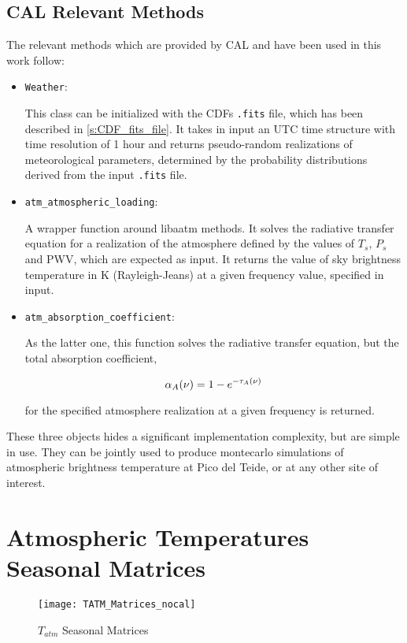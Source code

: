 \subsection{CAL Relevant Methods}

The relevant methods which are provided by CAL and have been used in this
work follow:

\begin{itemize}
        \item \texttt{Weather}:

        This class can be initialized with the CDFs \texttt{.fits} file, which
        has been described in \autoref{s:CDF_fits_file}. It takes in input
        an UTC time structure with time resolution of \num{1} hour and
        returns pseudo-random realizations of meteorological parameters,
        determined by the probability distributions derived from the input
        \texttt{.fits} file.

        \item \texttt{atm\_atmospheric\_loading}:

        A wrapper function around libaatm methods. It solves the radiative
        transfer equation for a realization of the atmosphere defined by
        the values of $T_s$,
        $P_s$ and PWV, which are expected as input. It returns the value of sky
        brightness temperature in \si{\kelvin} (Rayleigh-Jeans) at a given
        frequency value, specified in input.

        \item \texttt{atm\_absorption\_coefficient}:

        As the latter one, this function solves the radiative transfer equation,
        but the total absorption coefficient,

        \begin{equation}
                \alpha_A\qty(\nu) = 1 - e^{-\tau_A\qty(\nu)}
        \end{equation}

        for the specified atmosphere realization at a given frequency is
        returned.
\end{itemize}

These three objects hides a significant implementation complexity, but are
simple in use. They can be jointly used to produce montecarlo simulations of
atmospheric brightness temperature at Pico del Teide, or at any other site
of interest.


\section{Atmospheric Temperatures Seasonal Matrices}

\begin{figure}
        \centering
        \texttt{[image: TATM\_Matrices\_nocal]}
        \caption{$T_{atm}$ Seasonal Matrices}
        \label{fig:tatm_matrices_nocal}
\end{figure}

